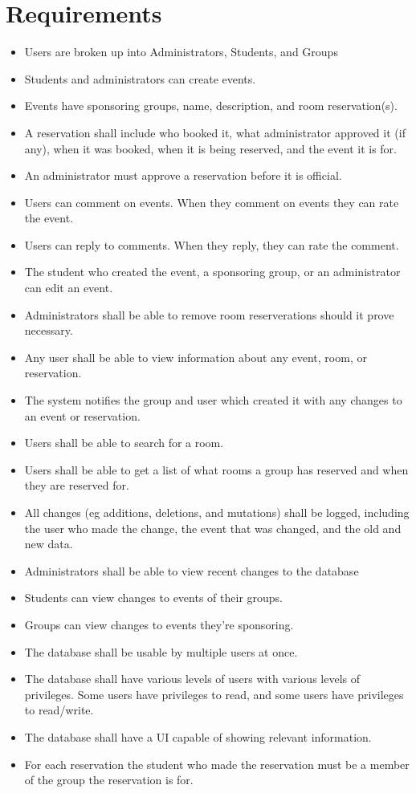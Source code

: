 \documentclass{article}
\begin{document}
\section{Requirements}
\begin{itemize}
\item Users are broken up into Administrators, Students, and Groups
\item Students and administrators can create events.
\item Events have sponsoring groups, name, description, and room reservation(s).
\item A reservation shall include who booked it, what administrator
approved it (if any), when it was booked, when it is being reserved,
and the event it is for.
\item An administrator must approve a reservation before it is official.
\item Users can comment on events. When they comment on events they can rate the
event.
\item Users can reply to comments. When they reply, they can rate the comment. 
\item The student who created the event, a sponsoring group, or an
administrator can edit an event.
\item Administrators shall be able to remove room reserverations
should it prove necessary.
\item Any user shall be able to view information about any event,
room, or reservation.
\item The system notifies the group and user which created it with any
changes to an event or reservation.
\item Users shall be able to search for a room.
\item Users shall be able to get a list of what rooms a group has
reserved and when they are reserved for.
\item All changes (eg additions, deletions, and mutations) shall be
logged, including the user who made the change, the event that was
changed, and the old and new data.
\item Administrators shall be able to view recent changes to the database
\item Students can view changes to events of their groups.
\item Groups can view changes to events they're sponsoring.
\item The database shall be usable by multiple users at once.
\item The database shall have various levels of users with various
levels of privileges. Some users have privileges to read, and some
users have privileges to read/write.
\item The database shall have a UI capable of showing relevant information.
\item For each reservation the student who made the reservation must
be a member of the group the reservation is for.
\end{itemize}
\end{document}
